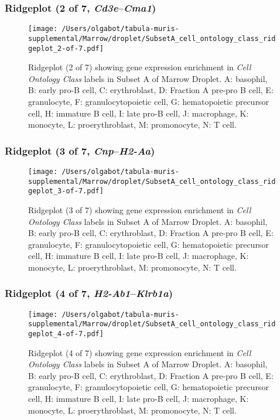 \clearpage

\subsubsection{Ridgeplot (2 of 7, \emph{Cd3e}--\emph{Cma1})}
\begin{figure}[h]
\centering
\texttt{[image: /Users/olgabot/tabula-muris-supplemental/Marrow/droplet/SubsetA\_cell\_ontology\_class\_ridgeplot\_2-of-7.pdf]}

\caption{ Ridgeplot (2 of 7)  showing gene expression enrichment in \emph{Cell Ontology Class} labels in Subset A of Marrow Droplet. A: basophil, B: early pro-B cell, C: erythroblast, D: Fraction A pre-pro B cell, E: granulocyte, F: granulocytopoietic cell, G: hematopoietic precursor cell, H: immature B cell, I: late pro-B cell, J: macrophage, K: monocyte, L: proerythroblast, M: promonocyte, N: T cell.}
\end{figure}


\clearpage

\subsubsection{Ridgeplot (3 of 7, \emph{Cnp}--\emph{H2-Aa})}
\begin{figure}[h]
\centering
\texttt{[image: /Users/olgabot/tabula-muris-supplemental/Marrow/droplet/SubsetA\_cell\_ontology\_class\_ridgeplot\_3-of-7.pdf]}

\caption{ Ridgeplot (3 of 7)  showing gene expression enrichment in \emph{Cell Ontology Class} labels in Subset A of Marrow Droplet. A: basophil, B: early pro-B cell, C: erythroblast, D: Fraction A pre-pro B cell, E: granulocyte, F: granulocytopoietic cell, G: hematopoietic precursor cell, H: immature B cell, I: late pro-B cell, J: macrophage, K: monocyte, L: proerythroblast, M: promonocyte, N: T cell.}
\end{figure}


\clearpage

\subsubsection{Ridgeplot (4 of 7, \emph{H2-Ab1}--\emph{Klrb1a})}
\begin{figure}[h]
\centering
\texttt{[image: /Users/olgabot/tabula-muris-supplemental/Marrow/droplet/SubsetA\_cell\_ontology\_class\_ridgeplot\_4-of-7.pdf]}

\caption{ Ridgeplot (4 of 7)  showing gene expression enrichment in \emph{Cell Ontology Class} labels in Subset A of Marrow Droplet. A: basophil, B: early pro-B cell, C: erythroblast, D: Fraction A pre-pro B cell, E: granulocyte, F: granulocytopoietic cell, G: hematopoietic precursor cell, H: immature B cell, I: late pro-B cell, J: macrophage, K: monocyte, L: proerythroblast, M: promonocyte, N: T cell.}
\end{figure}


